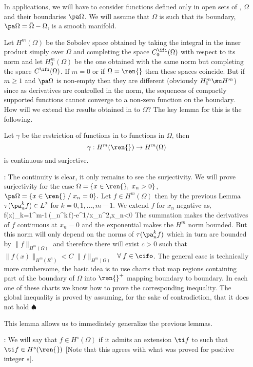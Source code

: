 In applications, we will have to consider functions defined only
in open sets of \ren{}, $\Omega$ and their boundaries $\pa\Omega$.
We will assume that $\Omega$ is such that its boundary, $\pa\Omega=\bar{\Omega}-\Omega$, 
is a smooth manifold.

Let $H^m(\Omega)$ be the Sobolev space obtained by taking the integral in the
inner product simply over $\Omega$ and completing the space
$C^{\ifi}_0 (\Omega)$
with respect to its norm and let $H^m_0(\Omega)$ be the one obtained with the same norm but
completing the space $C^{\ifi}(\Omega)$. If $m=0$ or if $\Omega=\ren{}$ 
then these spaces
coincide. But if $m\geq1$ and $\pa\Omega$ is non-empty then they are 
different
(obviously $H^m_0\su H^m$) since as derivatives are controlled in the norm, the
sequences of compactly supported functions cannot converge to a
non-zero function on the boundary.
How will we extend the results obtained in \ren{} to $\Omega$?
The key lemma for this is the following.

\blem
Let $\gamma$ be the restriction of functions in \ren{} to functions in $\Omega$,
then $$\gamma:H^m(\ren{})\to H^m(\Omega)$$ is continuous and surjective.
\elem
\espa

\pru:
The continuity is clear, it only remains to see the surjectivity.
We will prove surjectivity for the case $\Omega=\{x\in\ren{},\;x_n>0\}$, 
$\pa\Omega=\{x\in \ren{}\;/\;x_n=0\}.$
Let $f\in H^m(\Omega)$ then by the previous Lemma $\tau(\pa^k_n f)\in
L^2$ for $k=0,1,\ldots,m-1$. We extend $f$ for $x_n$
negative as,
\beq
f(x)\equiv\lc\sum_{k=1}^{m-1}\,\tau(\pa_n^k\,f)\rc\;-e^{1/x_n^2}\rp,\;\;x_n<0
\eeq
The summation makes the derivatives of $f$ continuous at $x_n=0$ and the
exponential makes the $H^m$ norm bounded.
But this norm will only depend on the norms of $\tau (\pa_n^k f)$ 
which in turn are bounded by $\|f\|_{H^{m}(\Omega)}$ and therefore 
there will exist $c>0$ such that $\|f(x)\|_{H^m(R^n)}<C\;\|f\|_{H^m(\Omega)}$
$\;\forall\;f\in\cifo$.
The general case is technically more cumbersome, the basic idea
is to use charts that map regions containing part of the 
boundary of $\Omega$ into $\ren{}^+$ mapping boundary to boundary. In each one
of these charts we know how to prove the corresponding inequality.
The global inequality is proved by assuming, for the sake of contradiction, that
it does not hold $\spadesuit$

This lemma allows us to immediately generalize the previous lemmas.

: We will say that $f\in H^s(\Omega)$ if it admits an extension
$\ti f$ to \ren{} such that $\ti f\in H^s(\ren{})$
[Note that this agrees with what was proved for positive integer $s$]. 

